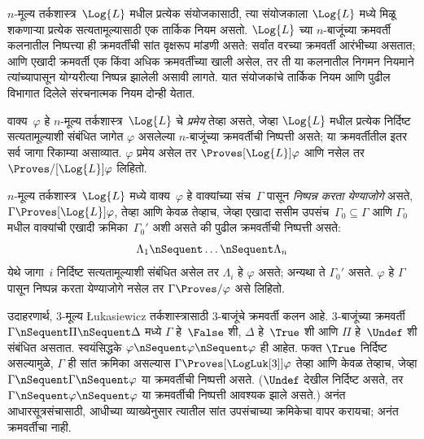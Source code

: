 $n$-मूल्य तर्कशास्त्र~$\Log{L}$ मधील प्रत्येक संयोजकासाठी,
त्या संयोजकाला $\Log{L}$ मध्ये मिळू शकणाऱ्या प्रत्येक
सत्यतामूल्यासाठी एक तार्किक नियम असतो. $\Log{L}$ च्या
$n$-बाजूंच्या क्रमवर्ती कलनातील निष्पत्त्या ही क्रमवर्तींची
सांत वृक्षरूप मांडणी असते: सर्वांत वरच्या क्रमवर्ती आरंभीच्या असतात;
आणि एखादी क्रमवर्ती एक किंवा अधिक क्रमवर्तींच्या खाली असेल,
तर ती या कलनातील निगमन नियमाने त्यांच्यापासून योग्यरीत्या
निष्पन्न झालेली असावी लागते. यात संयोजकांचे तार्किक नियम
आणि पुढील विभागात दिलेले संरचनात्मक नियम दोन्ही येतात.

\begin{defn}[प्रमेये]
वाक्य~$\varphi$ हे $n$-मूल्य तर्कशास्त्र~$\Log{L}$ चे
\emph{प्रमेय} तेव्हा असते, जेव्हा $\Log{L}$ मधील प्रत्येक निर्दिष्ट
सत्यतामूल्याशी संबंधित जागेत $\varphi$ असलेल्या $n$-बाजूंच्या
क्रमवर्तीची निष्पत्ती असते; या क्रमवर्तीतील
इतर सर्व जागा रिकाम्या असाव्यात. $\varphi$ प्रमेय असेल तर
$\Proves[\Log{L}] \varphi$ आणि नसेल तर $\Proves/[\Log{L}] \varphi$ लिहितो.
\end{defn}

\begin{defn}[निष्पन्नता]
$n$-मूल्य तर्कशास्त्र~$\Log{L}$ मध्ये वाक्य~$\varphi$
हे वाक्यांच्या संच~$\Gamma$ पासून \emph{निष्पन्न करता येण्याजोगे}
असते, $\Gamma \Proves[\Log{L}] \varphi$, तेव्हा आणि केवळ तेव्हाच,
जेव्हा एखादा ससीम उपसंच~$\Gamma_0 \subseteq \Gamma$
आणि $\Gamma_0$ मधील वाक्यांची एखादी क्रमिका~$\Gamma_0'$
अशी असते की पुढील क्रमवर्तीची निष्पत्ती असते:
\[ \Lambda_1 \nSequent \dots \nSequent \Lambda_n \]
येथे जागा~$i$ निर्दिष्ट सत्यतामूल्याशी संबंधित असेल तर
$\Lambda_i$ हे $\varphi$ असते; अन्यथा ते $\Gamma_0'$ असते.
$\varphi$ हे $\Gamma$ पासून निष्पन्न करता येण्याजोगे नसेल तर
$\Gamma \Proves/ \varphi$ असे लिहितो.
\end{defn}

उदाहरणार्थ, $3$-मूल्य \L ukasiewicz तर्कशास्त्रासाठी
$3$-बाजूंचे क्रमवर्ती कलन आहे. $3$-बाजूंच्या क्रमवर्ती
$\Gamma \nSequent \Pi \nSequent \Delta$ मध्ये $\Gamma$
हे~$\False$ शी, $\Delta$ हे~$\True$ शी आणि $\Pi$
हे~$\Undef$ शी संबंधित असतात. स्वयंसिद्धके
$\varphi \nSequent \varphi \nSequent \varphi$ ही आहेत. फक्त $\True$
निर्दिष्ट असल्यामुळे, $\Gamma$ ही सांत क्रमिका असल्यास
$\Gamma \Proves[\LogLuk[3]] \varphi$
तेव्हा आणि केवळ तेव्हाच, जेव्हा $\Gamma \nSequent \Gamma \nSequent \varphi$
या क्रमवर्तीची निष्पत्ती असते. ($\Undef$ देखील निर्दिष्ट
असते, तर $\Gamma \nSequent \varphi \nSequent \varphi$ या क्रमवर्तीची
निष्पत्ती आवश्यक झाले असते.)
अनंत आधारसूत्रसंचासाठी, आधीच्या व्याख्येनुसार त्यातील सांत
उपसंचाच्या क्रमिकेचा वापर करायचा; अनंत क्रमवर्तीचा नाही.












